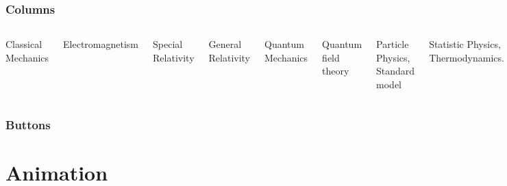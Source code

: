 \documentclass{beamer}
\begin{document}
\begin{frame}
	\frametitle{Columns}
	\begin{columns}
		Classical Mechanics
		
		Electromagnetism
		
		Special Relativity
		
		General Relativity
		
		Quantum Mechanics
		
		Quantum field theory
		
		Particle Physics, Standard model
		
		Statistic Physics, Thermodynamics.

		\begin{figure}
			\centering
			\includegraphics[width=\columnwidth]{./data/MapQM.jpg}
		\end{figure}

	\end{columns}

\end{frame}


\begin{frame}
	\frametitle{Buttons}
	\hyperlink{contents}{}
	\hyperlink{contents}{}
	\hyperlink{contents}{}
	\hyperlink{contents}{}
\end{frame}



\section{Animation}
\end{document}
